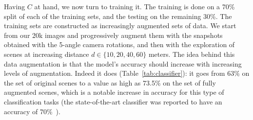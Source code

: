 
Having $C$ at hand, we now turn to training it. The training is done on a 70\% split of each of the training sets, and the testing on the remaining 30\%. The training sets are constructed as  increasingly augmented sets of data. We start from our 20k images and progressively augment them with  the snapshots obtained with the 5-angle camera rotations, and then with the exploration of scenes at increasing distance $d \in \{10,20,40,60\}$ meters. The idea behind this data augmentation is that the model's accuracy should increase with increasing levels of augmentation. Indeed it does (Table~\ref{tab:classifier}): it goes from 63\% on the set of original scenes to a value as high as  73.5\% on the set of fully augmented scenes, which is a notable increase in accuracy for this type of classification tasks (the state-of-the-art classifier was reported to have an accuracy of 70\%~\cite{dubey2016deep}).








